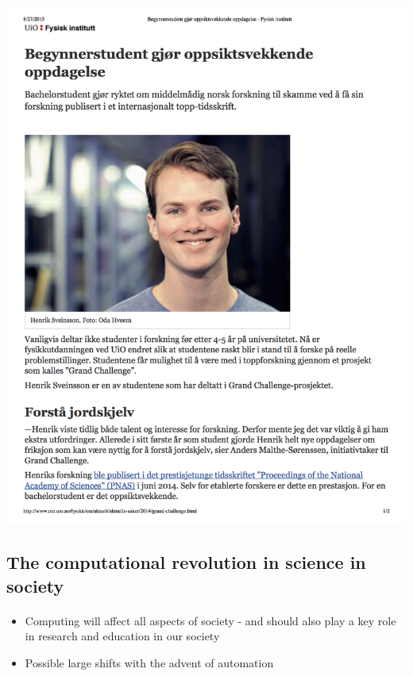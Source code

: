 \documentclass[%
twoside,                 %
final,                   %
10pt]{article}
\begin{document}
\noindent





\centerline{\includegraphics[width=1.0\linewidth]{fig-future/pnas.png}}



\subsection{The computational revolution in science in society}


\paragraph{}
\begin{itemize}
\item Computing will affect all aspects of society - and should also play a key role in research and education in our society

\item Possible large shifts with the advent of automation
\end{itemize}
\end{document}
